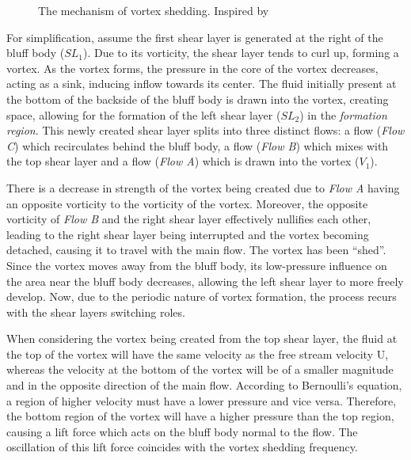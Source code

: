 \begin{figure}[H]
\begin{center}
	\end{center}
	\caption{The mechanism of vortex shedding. Inspired by \textcite[3]{shen2010_vortexmeter}}
	\label{fig:mechanismOfVortexShedding}
\end{figure}

For simplification, assume the first shear layer is generated at the right of the bluff body ($SL_{1}$). Due to its vorticity, the shear layer tends to curl up, forming a vortex. As the vortex forms, the pressure in the core of the vortex decreases, acting as a sink, inducing inflow towards its center. The fluid initially present at the bottom of the backside of the bluff body is drawn into the vortex, creating space, allowing for the formation of the left shear layer ($SL_{2}$) in the \textit{formation region}. This newly created shear layer splits into three distinct flows: a flow (\textit{Flow C}) which recirculates behind the bluff body, a flow (\textit{Flow B}) which mixes with the top shear layer and a flow (\textit{Flow A}) which is drawn into the vortex ($V_{1}$).

There is a decrease in strength of the vortex being created due to \textit{Flow A} having an opposite vorticity to the vorticity of the vortex. Moreover, the opposite vorticity of \textit{Flow B} and the right shear layer effectively nullifies each other, leading to the right shear layer being interrupted and the vortex becoming detached, causing it to travel with the main flow. The vortex has been “shed”. Since the vortex moves away from the bluff body, its low-pressure influence on the area near the bluff body decreases, allowing the left shear layer to more freely develop. Now, due to the periodic nature of vortex formation, the process recurs with the shear layers switching roles. 

When considering the vortex being created from the top shear layer, the fluid at the top of the vortex will have the same velocity as the free stream velocity U, whereas the velocity at the bottom of the vortex will be of a smaller magnitude and in the opposite direction of the main flow. According to Bernoulli’s equation, a region of higher velocity must have a lower pressure and vice versa. Therefore, the bottom region of the vortex will have a higher pressure than the top region, causing a lift force which acts on the bluff body normal to the flow. The oscillation of this lift force coincides with the vortex shedding frequency. 

